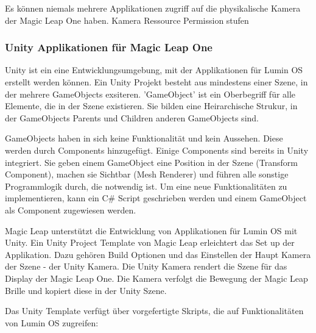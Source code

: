 
Es können niemals mehrere Applikationen zugriff auf die physikalische Kamera der Magic Leap One haben. Kamera Ressource
Permission stufen

\subsubsection{Unity Applikationen für Magic Leap One}
%
Unity ist ein eine Entwicklungsumgebung, mit der Applikationen für Lumin OS erstellt werden können. Ein Unity Projekt besteht aus mindestens einer Szene, in der mehrere GameObjects exsiteren. 'GameObject' ist ein Oberbegriff für alle Elemente, die in der Szene existieren. Sie bilden eine Heirarchische Strukur, in der GameObjects Parents und Children anderen GameObjects sind.\citep{unitygameobject}

GameObjects haben in sich keine Funktionalität und kein Aussehen. Diese werden durch Components hinzugefügt. Einige Components sind bereits in Unity integriert. Sie geben einem GameObject eine Position in der Szene (Transform Component), machen sie Sichtbar (Mesh Renderer) und führen alle sonstige Programmlogik durch, die notwendig ist. Um eine neue Funktionalitäten zu implementieren, kann ein C\# Script geschrieben werden und einem GameObject als Component zugewiesen werden.

Magic Leap unterstützt die Entwicklung von Applikationen für Lumin OS mit Unity. Ein Unity Project Template von Magic Leap erleichtert das Set up der Applikation. Dazu gehören Build Optionen und das Einstellen der Haupt Kamera der Szene - der Unity Kamera. Die Unity Kamera rendert die Szene für das Display der Magic Leap One. Die Kamera verfolgt die Bewegung der Magic Leap Brille und kopiert diese in der Unity Szene. %

Das Unity Template verfügt über vorgefertigte Skripts, die auf Funktionalitäten von Lumin OS zugreifen:

